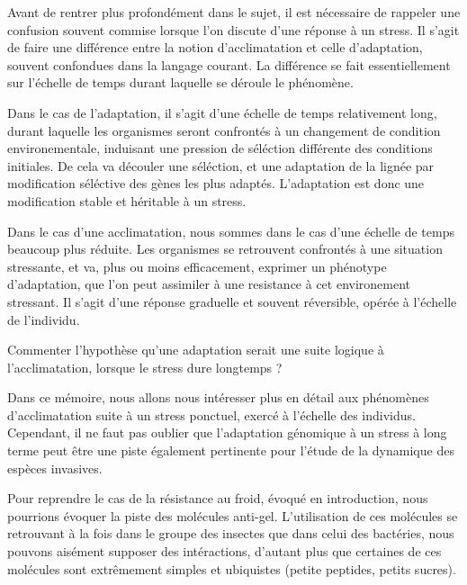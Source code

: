 Avant de rentrer plus profondément dans le sujet, il est nécessaire de
rappeler une confusion souvent commise lorsque l'on discute d'une réponse à un
stress. Il s'agit de faire une différence entre la notion d'acclimatation et
celle d'adaptation, souvent confondues dans la langage courant. La différence
se fait essentiellement sur l'échelle de temps durant laquelle se déroule le
phénomène.

Dans le cas de l'adaptation, il s'agit d'une échelle de temps relativement
long, durant laquelle les organismes seront confrontés à un changement de
condition environementale, induisant une pression de séléction différente des
conditions initiales. De cela va découler une séléction, et une adaptation de
la lignée par modification séléctive des gènes les plus adaptés. L'adaptation
est donc une modification stable et héritable à un stress.

Dans le cas d'une acclimatation, nous sommes dans le cas d'une échelle de
temps beaucoup plus réduite. Les organismes se retrouvent confrontés à une
situation stressante, et va, plus ou moins efficacement, exprimer un phénotype
d'adaptation, que l'on peut assimiler à une resistance à cet environement
stressant. Il s'agit d'une réponse graduelle et souvent réversible, opérée à
l'échelle de l'individu.

\begin{note}
	Commenter l'hypothèse qu'une adaptation serait une suite logique à l'acclimatation, lorsque le stress dure longtemps ?
\end{note}


Dans ce mémoire, nous allons nous intéresser plus en détail aux phénomènes
d'acclimatation suite à un stress ponctuel, exercé à l'échelle des individus.
Cependant, il ne faut pas oublier que l'adaptation génomique à un stress à
long terme peut être une piste également pertinente pour l'étude de la
dynamique des espèces invasives.

Pour reprendre le cas de la résistance au froid, évoqué en introduction, nous
pourrions évoquer la piste des molécules anti-gel. L'utilisation de ces
molécules se retrouvant à la fois dans le groupe des insectes\cite{duman2001} que dans celui
des bactéries\cite{xu1998}, nous pouvons aisément supposer des intéractions, d'autant plus
que certaines de ces molécules sont extrêmement simples et ubiquistes (petite
peptides, petits sucres).

